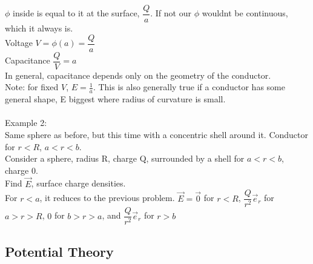 \documentclass[a4paper,11pt]{article}
\begin{document}
$\phi$ inside is equal to it at the surface, $\dfrac{Q}{a}$. If not our $\phi$ wouldnt be continuous, which it always is.\\
Voltage $V=\phi(a)=\dfrac{Q}{a}$\\
Capacitance $\dfrac{Q}{V}=a$\\
In general, capacitance depends only on the geometry of the conductor.\\
Note: for fixed $V$, $E=\frac{1}{a}$. This is also generally true if a conductor has some general shape, E biggest where radius of curvature is small.\\
\\
Example 2:\\
Same sphere as before, but this time with a concentric shell around it. Conductor for $r<R$, $a<r<b$.\\
Consider a sphere, radius R, charge Q, surrounded by a shell for $a<r<b$, charge 0.\\
Find $\vec{E}$, surface charge densities.\\
For $r<a$, it reduces to the previous problem. $\vec{E}=\vec{0}$ for $r<R$, $\dfrac{Q}{r^2}\vec{e}_r$ for $a>r>R$, $0$ for $b>r>a$, and $\dfrac{Q}{r^2}\vec{e}_r$ for $r>b$

\subsection{Potential Theory}
\end{document}
